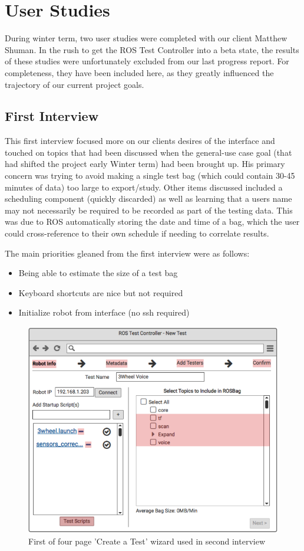 \documentclass[onecolumn, draftclsnofoot,10pt, compsoc]{IEEEtran}
\begin{document}
\section{User Studies}
During winter term, two user studies were completed with our client Matthew Shuman. In the rush to get the ROS Test Controller into a beta state, the results of these studies were unfortunately excluded from our last progress report. For completeness, they have been included here, as they greatly influenced the trajectory of our current project goals. 

\subsection{First Interview}
This first interview focused more on our clients desires of the interface and touched on topics that had been discussed when the general-use case goal (that had shifted the project early Winter term) had been brought up. His primary concern was trying to avoid making a single test bag (which could contain 30-45 minutes of data) too large to export/study. Other items discussed included a scheduling component (quickly discarded) as well as learning that a users name may not necessarily be required to be recorded as part of the testing data. This was due to ROS automatically storing the date and time of a bag, which the user could cross-reference to their own schedule if needing to correlate results.

The main priorities gleaned from the first interview were as follows:
\begin{itemize}
	\item Being able to estimate the size of a test bag
	\item Keyboard shortcuts are nice but not required
	\item Initialize robot from interface (no ssh required)
\end{itemize}

\begin{figure}
	\centering
	\includegraphics[width=0.5\linewidth]{"Hi-fi mockup of wizard"}
	\caption{First of four page 'Create a Test' wizard used in second interview}
	\label{fig:hi-fi-mockup-of-wizard}
\end{figure}
\end{document}
